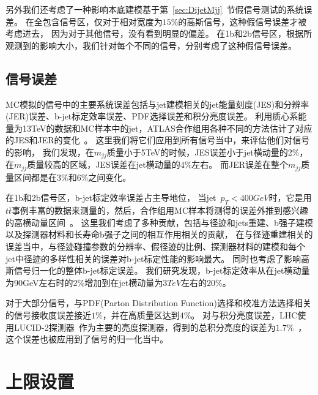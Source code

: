 另外我们还考虑了一种影响本底建模基于第~\ref{sec:DijetMjj}~节假信号测试的系统误差。 
在全包含信号区，仅对于相对宽度为$15\%$的高斯信号，这种假信号误差才被考虑进去，
因为对于其他信号，没有看到明显的偏差。
在1b和2b信号区，根据所观测到的影响大小，我们针对每个不同的信号，分别考虑了这种假信号误差。

\subsection{信号误差} 
\label{sec:DijetSysSignal}
MC模拟的信号中的主要系统误差包括与jet建模相关的jet能量刻度(JES)和分辨率(JER)误差、b-jet标定效率误差、PDF选择误差和积分亮度误差。
利用质心系能量为13TeV的数据和MC样本中的jet，ATLAS合作组用各种不同的方法估计了对应的JES和JER的变化~\cite{PERF-2016-04}。
这里我们将它们应用到所有信号当中，来评估他们对信号的影响，
我们发现，在$m_{jj}$质量小于5TeV的时候，JES误差小于jet横动量的2$\%$，在$m_{jj}$质量较高的区域，JES误差在jet横动量的$4\%$左右。
而JER误差在整个$m_{jj}$质量区间都是在$3\%$和$6\%$之间变化。

在1b和2b信号区，b-jet标定效率误差占主导地位，
当jet~$p_{T}<400GeV$时，它是用$t\overline{t}$事例丰富的数据来测量的，然后，合作组用MC样本将测得的误差外推到感兴趣的高横动量区间~\cite{FTAG-2018-01}。
这里我们考虑了多种贡献，包括与径迹和jets重建、b强子建模以及探测器材料和长寿命b强子之间的相互作用相关的贡献，
在与径迹重建相关的误差当中，与径迹碰撞参数的分辨率、假径迹的比例、探测器材料的建模和每个jet中径迹的多样性相关的误差对b-jet标定性能的影响最大。
同时也考虑了影响高斯信号归一化的整体b-jet标定误差。
我们研究发现，b-jet标定效率从在jet横动量为90GeV左右时的$2\%$增加到在jet横动量为$3TeV$左右的$20\%$。

对于大部分信号，与PDF(Parton Distribution Function)选择和校准方法选择相关的信号接收度误差接近$1\%$，并在高质量区达到$4\%$。
对与积分亮度误差，LHC使用LUCID-2探测器~\cite{LUCID2}作为主要的亮度探测器，得到的总积分亮度的误差为$1.7\%$~\cite{ATLAS-CONF-2019-021}，
这个误差也被应用到了信号的归一化当中。




\section{上限设置} 
\label{sec:DijetSig}

